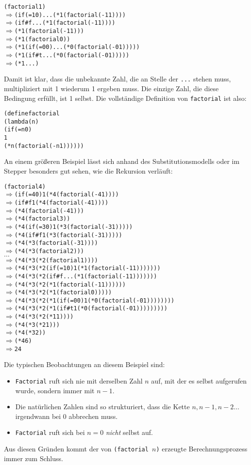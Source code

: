\begin{alltt}
(factorial 1)
\(\Longrightarrow\) (if (= 1 0) ... (* 1 (factorial (- 1 1))))
\(\Longrightarrow\) (if #f ... (* 1 (factorial (- 1 1))))
\(\Longrightarrow\) (* 1 (factorial (- 1 1)))
\(\Longrightarrow\) (* 1 (factorial 0))
\(\Longrightarrow\) (* 1 (if (= 0 0) ... (* 0 (factorial (- 0 1)))))
\(\Longrightarrow\) (* 1 (if #t ... (* 0 (factorial (- 0 1)))))
\(\Longrightarrow\) (* 1 ...)
\end{alltt}
%
Damit ist klar, dass die unbekannte Zahl, die an Stelle der 
\texttt{...} stehen muss, multipliziert mit 1 wiederum 1 ergeben muss.
Die einzige Zahl, die diese Bedingung erfüllt, ist 1 selbst.  Die
vollständige Definition von \texttt{factorial} ist also:
%
\begin{alltt}
(define factorial
  (lambda (n)
    (if (= n 0)
        1
        (* n (factorial (- n 1))))))
\end{alltt}
%
An einem größeren Beispiel lässt sich anhand des Substitutionsmodells
oder im Stepper besonders gut sehen, wie die Rekursion verläuft:
%
\begin{alltt}
(factorial 4)
\(\Longrightarrow\) (if (= 4 0) 1 (* 4 (factorial (- 4 1))))
\(\Longrightarrow\) (if #f 1 (* 4 (factorial (- 4 1))))
\(\Longrightarrow\) (* 4 (factorial (- 4 1)))
\(\Longrightarrow\) (* 4 (factorial 3))
\(\Longrightarrow\) (* 4 (if (= 3 0) 1 (* 3 (factorial (- 3 1)))))
\(\Longrightarrow\) (* 4 (if #f 1 (* 3 (factorial (- 3 1)))))
\(\Longrightarrow\) (* 4 (* 3 (factorial (- 3 1))))
\(\Longrightarrow\) (* 4 (* 3 (factorial 2)))
\(\ldots\)
\(\Longrightarrow\) (* 4 (* 3 (* 2 (factorial 1))))
\(\Longrightarrow\) (* 4 (* 3 (* 2 (if (= 1 0) 1 (* 1 (factorial (- 1 1)))))))
\(\Longrightarrow\) (* 4 (* 3 (* 2 (if #f ... (* 1 (factorial (- 1 1)))))))
\(\Longrightarrow\) (* 4 (* 3 (* 2 (* 1 (factorial (- 1 1))))))
\(\Longrightarrow\) (* 4 (* 3 (* 2 (* 1 (factorial 0)))))
\(\Longrightarrow\) (* 4 (* 3 (* 2 (* 1 (if (= 0 0) 1 (* 0 (factorial (- 0 1))))))))
\(\Longrightarrow\) (* 4 (* 3 (* 2 (* 1 (if #t 1 (* 0 (factorial (- 0 1)))))))))
\(\Longrightarrow\) (* 4 (* 3 (* 2 (* 1 1))))
\(\Longrightarrow\) (* 4 (* 3 (* 2 1)))
\(\Longrightarrow\) (* 4 (* 3 2))
\(\Longrightarrow\) (* 4 6)
\(\Longrightarrow\) 24
\end{alltt}
%
Die typischen Beobachtungen an diesem Beispiel sind:
%
\begin{itemize}
\item \texttt{Factorial} ruft sich nie mit derselben Zahl $n$ auf, mit
  der es selbst aufgerufen wurde, sondern immer mit $n-1$.
\item Die natürlichen Zahlen sind so strukturiert, dass die Kette $n,
  n-1, n-2 \ldots$ irgendwann bei $0$ abbrechen muss.
\item \texttt{Factorial} ruft sich bei $n=0$ \emph{nicht}
  selbst auf.
\end{itemize}
%
Aus diesen Gründen kommt der von
\texttt{(factorial $n$)} erzeugte Berechnungsprozess immer zum Schluss.  

